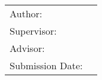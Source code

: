 \begin{titlepage}
  \centering


  {\huge\MakeUppercase{\getFaculty{}}}\\

  \vspace{5mm}
  {\large\MakeUppercase{\getUniversity{}}}\\

  \vspace{10mm}
  {\Large \getDoctype{}}

  \vspace{5mm}
  \begin{spacing}{2}
  {\huge\bfseries \getTitle{} }	
  \end{spacing}
  
  \begin{spacing}{2}
  {\huge\bfseries \foreignlanguage{ngerman}{\getTitleGer{}}}
  \end{spacing}
  
  
  \vspace{15mm}
  \begin{tabular}{l l}
    Author:          & \getAuthor{} \\
    Supervisor:      & \getSupervisor{} \\
    Advisor:         & \getAdvisor{} \\
    Submission Date: & \getSubmissionDate{} \\
  \end{tabular}
\end{titlepage}
